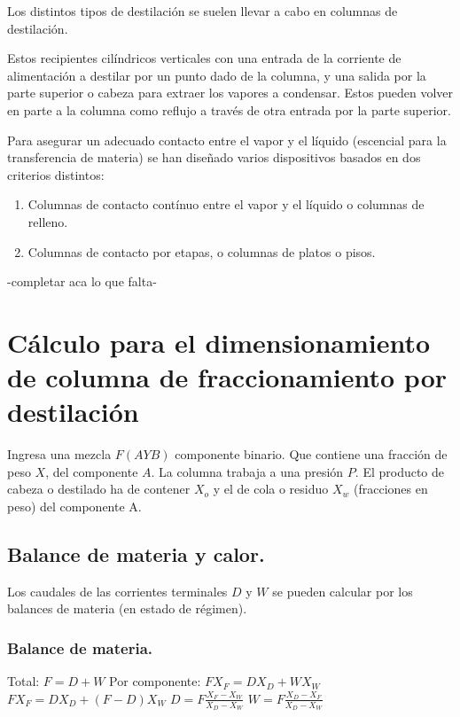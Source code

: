 \documentclass[11pt,openany]{book}
\begin{document}
Los distintos tipos de destilación se suelen llevar a cabo en columnas de destilación.

Estos recipientes cilíndricos verticales con una entrada de la corriente de alimentación a 
destilar por un punto dado de la columna, y una salida por la parte superior o cabeza para extraer 
los vapores a condensar. Estos pueden volver en parte a la columna como reflujo a través de otra entrada por la 
parte superior.

Para asegurar un adecuado contacto entre el vapor y el líquido (escencial para la transferencia de materia) se han 
diseñado varios dispositivos basados en dos criterios distintos:
\begin{enumerate}
\item Columnas de contacto contínuo entre el vapor y el líquido o columnas de relleno.
\item Columnas de contacto por etapas, o columnas de platos o pisos.
\end{enumerate}
-completar aca lo que falta-

\section{Cálculo para el dimensionamiento de columna de fraccionamiento por destilación}

Ingresa una mezcla $F(A Y B)$ componente binario. Que contiene una fracción de peso $X$,
del componente $A$.
La columna trabaja a una presión $P$.
El producto de cabeza o destilado ha de contener $X_o$ y el de cola o residuo $X_w$
(fracciones en peso) del componente A.

\subsection{Balance de materia y calor.}
Los caudales de las corrientes terminales $D$ y $W$ se pueden calcular por los balances de materia 
(en estado de régimen).

\subsubsection{Balance de materia.}
Total: $F=D+W$
\newline\newline
Por componente: $F X_F = D X_D + W X_W$
\newline\newline
$F X_F = D X_D + (F-D) X_W$
\newline\newline
$D=F \frac{X_F - X_W}{X_D-X_W}$
\newline\newline
$W=F \frac{X_D - X_F}{X_D-X_W}$
\end{document}
